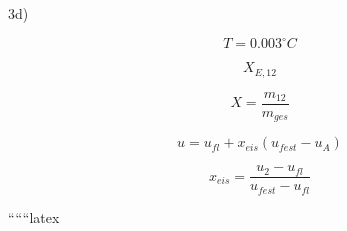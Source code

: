 3d)

\[
T = 0.003^\circ C
\]

\[
X_{E,12}
\]

\[
X = \frac{m_{12}}{m_{ges}}
\]

\[
u = u_{fl} + x_{eis}(u_{fest} - u_A)
\]

\[
x_{eis} = \frac{u_2 - u_{fl}}{u_{fest} - u_{fl}}
\]

``````latex